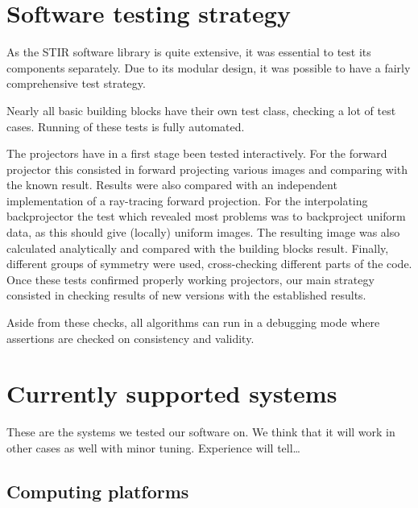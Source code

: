 \documentclass{article}
\begin{document}
\section{
Software testing strategy}

As the STIR software library is quite extensive, it was essential 
to test its components separately. Due to its modular design, 
it was possible to have a fairly comprehensive test strategy.

Nearly all basic building blocks have their own test class, checking 
a lot of test cases. Running of these tests is fully automated.

The projectors have in a first stage been tested interactively. 
For the forward projector this consisted in forward projecting 
various images and comparing with the known result. Results were 
also compared with an independent implementation of a ray-tracing 
forward projection. For the interpolating backprojector the test 
which revealed most problems was to backproject uniform data, 
as this should give (locally) uniform images. The resulting image 
was also calculated analytically and compared with the building 
blocks result. Finally, different groups of symmetry were used, 
cross-checking different parts of the code. Once these tests 
confirmed properly working projectors, our main strategy consisted 
in checking results of new versions with the established results.

Aside from these checks, all algorithms can run in a debugging 
mode where assertions are checked on consistency and validity.



\section{
Currently supported systems}

These are the systems we tested our software on. We think that 
it will work in other cases as well with minor tuning. Experience 
will tell\dots 



\subsection{
Computing platforms}
\end{document}
